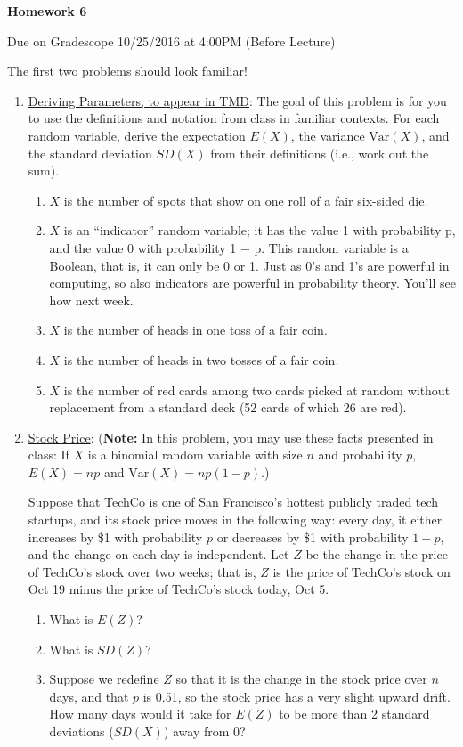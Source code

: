 \documentclass[11pt]{article}
\newcommand{\V}{\mathrm{Var}}
\begin{document}
\centerline{\textbf{Homework 6}}
\centerline{Due on Gradescope 10/25/2016 at 4:00PM (Before Lecture)}

The first two problems should look familiar!

\begin{enumerate}
\item \underline{Deriving Parameters, to appear in TMD}:
The goal of this problem is for you to use the definitions and notation from class in familiar
contexts. For each random variable, derive the expectation $E(X)$, the variance $\V(X)$, and the standard deviation $SD(X)$ from their definitions (i.e., work out the sum). 
\begin{enumerate}
\item $X$ is the number of spots that show on one roll of a fair six-sided die.
\item $X$ is an ``indicator'' random variable; it has the value 1 with probability p, and the value 0
with probability 1 − p. This random variable is a Boolean, that is, it can only be 0 or 1. Just as
0’s and 1’s are powerful in computing, so also indicators are powerful in probability theory. You’ll see how next week.
\item $X$ is the number of heads in one toss of a fair coin.
\item $X$ is the number of heads in two tosses of a fair coin.
\item $X$ is the number of red cards among two cards picked at random without replacement from
a standard deck (52 cards of which 26 are red).
\end{enumerate}

\item \underline{Stock Price}:
    ({\bf Note:} In this problem, you may use these facts presented in class: If $X$ is a binomial random variable with size $n$ and probability $p$, $E(X) = np$ and $\V(X) = np(1-p)$.)

Suppose that TechCo is one of San Francisco's hottest publicly traded tech startups, and its stock price moves in the following way: every day, it either increases by \$1 with probability $p$ or decreases by \$1 with probability $1-p$, and the change on each day is independent. Let $Z$ be the change in the price of TechCo's stock over two weeks; that is, $Z$ is the price of TechCo's stock on Oct 19 minus the price of TechCo's stock today, Oct 5.

\begin{enumerate}
    \item What is $E(Z)$?
    \item What is $SD(Z)$?
    \item Suppose we redefine $Z$ so that it is the change in the stock price over $n$ days, and that $p$ is 0.51, so the stock price has a very slight upward drift. How many days would it take for $E(Z)$ to be more than 2 standard deviations ($SD(X)$) away from 0?
\end{enumerate}


\end{enumerate}
\end{document}

